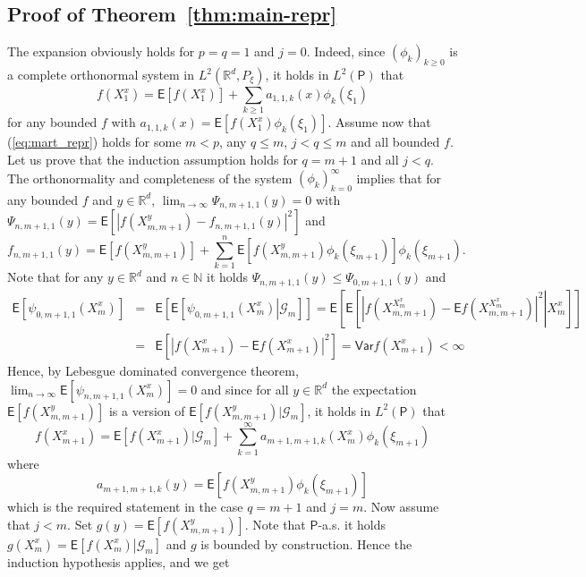 \documentclass[bj]{imsart}
\def\PE{\mathsf{E}}
\def\PVar{\mathsf{Var}}
\def\nset{\mathbb{N}}
\def\rset{\mathbb{R}}
\def\rset{\mathbb{R}}
\begin{document}
\subsection{Proof of Theorem~\ref{thm:main-repr}}
The expansion obviously holds for $p = q=1$ and $j=0$.
Indeed, since $\left(\phi_{k}\right)_{k \geq 0}$ is a complete orthonormal system in \(L^2(\mathbb{R}^d, P_{\xi})\), it holds in \(L^2(\mathsf{P})\) that
\[
f(X^x_{1})=\PE[f(X^x_{1})]+\sum_{k\geq1}a_{1,1,k}(x)\phi_{k}(\xi_{1})
\]
for any bounded $f$ with $a_{1,1,k}(x)=\PE[f(X_{1}^x)\phi_{k}(\xi_{1})]$.
Assume now that (\ref{eq:mart_repr}) holds for some $m < p$, any $q \leq m$, $j < q \leq m$ and all bounded $f$. Let us prove that the induction assumption holds for $q=m+1$ and all $j < q$.
The orthonormality and completeness
of the system $\left(\phi_{k}\right)_{k=0}^\infty$ implies that for any bounded $f$ and $y \in \rset^d$,
$\lim_{n \rightarrow \infty}\Psi_{n,m+1,1}(y)= 0$ with $\Psi_{n,m+1,1}(y)= \PE[|f(X^y_{m,m+1}) - f_{n,m+1,1}(y)|^2]$ and
\[
f_{n,m+1,1}(y) = \PE[f(X^y_{m,m+1})] +  \sum\limits_{k=1}^{n}\PE[f(X^y_{m,m+1})\phi_{k}(\xi_{m+1})]\phi_k(\xi_{m+1}).
\]
Note that  for any $y \in \rset^d$ and $n \in \nset$ it holds $\Psi_{n,m+1,1}(y) \leq \Psi_{0,m+1,1}(y)$ and
\begin{eqnarray*}
\PE \left[ \psi_{0,m+1,1}(X_m^x) \right] &=& \PE \left[ \left. \PE \left[ \psi_{0,m+1,1}(X_m^x) \right| \mathcal{G}_m\right]\right] = \PE \left[ \left. \PE \left[ |f(X^{X_m^x}_{m,m+1}) - \PE f(X^{X_m^x}_{m,m+1})|^2 \right| X_m^x\right]\right]
\\
&=& \PE \left[ |f(X_{m+1}^x) - \PE f(X_{m+1}^x)|^2 \right] = \PVar{f(X_{m+1}^x)} < \infty
\end{eqnarray*}
Hence, by Lebesgue dominated convergence theorem, $\lim_{n \rightarrow \infty}\PE \left[\psi_{n,m+1,1}(X_m^x)\right] = 0$ and since for all $y \in \rset^d$ the expectation $\PE[f(X^y_{m,m+1})]$ is a version of $\PE \left[f(X^y_{m,m+1}) | \mathcal{G}_m \right]$, it holds in \(L^2(\mathsf{P})\) that
\begin{equation}
\label{eq:1-step-decomp}
f(X^x_{m+1}) = \PE[f(X^x_{m+1})|\mathcal{G}_m] + \sum\limits_{k=1}^{\infty}a_{m+1,m+1,k}(X^x_{m})\phi_{k}(\xi_{m+1})
\end{equation}
where
\[
a_{m+1,m+1,k}(y) = \PE \left[f(X^y_{m,m+1})\phi_k\left(\xi_{m+1}\right)\right]
\]
which is the required statement in the case $q = m+1$ and $j=m$.
Now assume that $j<m$.
Set $g(y) = \PE \left[f(X_{m,m+1}^y)\right]$. Note that $\mathsf{P}$-a.s. it holds $g(X_m^x) = \PE\left[\left.f(X_m^x) \right| \mathcal{G}_m\right]$ and $g$ is bounded by construction. Hence the induction hypothesis applies, and we get
\end{document}
